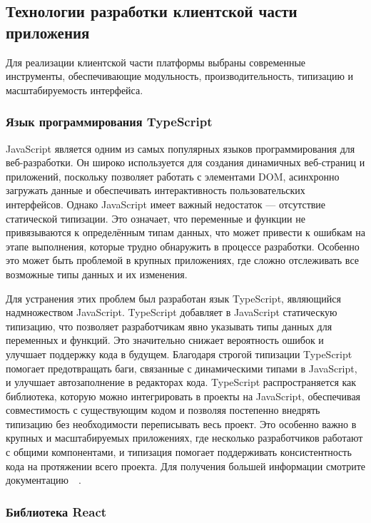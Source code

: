 \subsection{Технологии разработки клиентской части приложения}

Для реализации клиентской части платформы выбраны современные инструменты, обеспечивающие модульность, производительность, типизацию и масштабируемость интерфейса.

\subsubsection{Язык программирования TypeScript}

JavaScript является одним из самых популярных языков программирования для веб-разработки. Он широко используется для создания динамичных веб-страниц и приложений, поскольку позволяет работать с элементами DOM, асинхронно загружать данные и обеспечивать интерактивность пользовательских интерфейсов. Однако JavaScript имеет важный недостаток — отсутствие статической типизации. Это означает, что переменные и функции не привязываются к определённым типам данных, что может привести к ошибкам на этапе выполнения, которые трудно обнаружить в процессе разработки. Особенно это может быть проблемой в крупных приложениях, где сложно отслеживать все возможные типы данных и их изменения.

Для устранения этих проблем был разработан язык TypeScript, являющийся надмножеством JavaScript. TypeScript добавляет в JavaScript статическую типизацию, что позволяет разработчикам явно указывать типы данных для переменных и функций. Это значительно снижает вероятность ошибок и улучшает поддержку кода в будущем. Благодаря строгой типизации TypeScript помогает предотвращать баги, связанные с динамическими типами в JavaScript, и улучшает автозаполнение в редакторах кода. TypeScript распространяется как библиотека, которую можно интегрировать в проекты на JavaScript, обеспечивая совместимость с существующим кодом и позволяя постепенно внедрять типизацию без необходимости переписывать весь проект. Это особенно важно в крупных и масштабируемых приложениях, где несколько разработчиков работают с общими компонентами, и типизация помогает поддерживать консистентность кода на протяжении всего проекта. Для получения большей информации смотрите документацию~~\cite{typescript_handbook}.

\subsubsection{Библиотека React}

